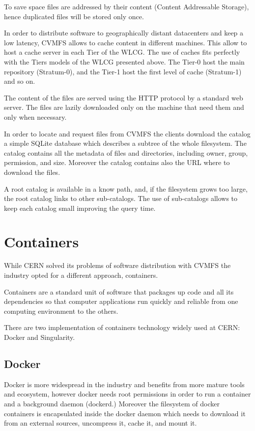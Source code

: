 To save space files are addressed by their content (Content Addressable
Storage), hence duplicated files will be stored only once.

In order to distribute software to geographically distant datacenters and keep
a low latency, CVMFS allows to cache content in different machines. This allow
to host a cache server in each Tier of the WLCG. The use of caches fits
perfectly with the Tiers models of the WLCG presented above. The Tier-0 host
the main repository (Stratum-0), and the Tier-1 host the first level of cache
(Stratum-1) and so on.

The content of the files are served using the HTTP protocol by a standard
web server. The files are lazily downloaded only on the machine that need them
and only when necessary.

In order to locate and request files from CVMFS the clients download the
catalog a simple SQLite database which describes a subtree of the whole
filesystem.  The catalog contains all the metadata of files and directories,
including owner, group, permission, and size. Moreover the catalog contains
also the URL where to download the files.

A root catalog is available in a know path, and, if the filesystem grows too
large, the root catalog links to other sub-catalogs. The use of sub-catalogs
allows to keep each catalog small improving the query time.

\section{Containers}

While CERN solved its problems of software distribution with CVMFS the industry
opted for a different approach, containers.

Containers are a standard unit of software that packages up code and all its
dependencies so that computer applications run quickly and reliable from one
computing environment to the others.

There are two implementation of containers technology widely used at CERN:
Docker and Singularity.

\subsection{Docker}
\label{subsec:docker-thin-images}

Docker is more widespread in the industry and benefits from more mature tools
and ecosystem, however docker needs root permissions in order to run a
container and a background daemon (dockerd.) Moreover the filesystem of docker
containers is encapsulated inside the docker daemon which needs to download it
from an external sources, uncompress it, cache it, and mount it. 

